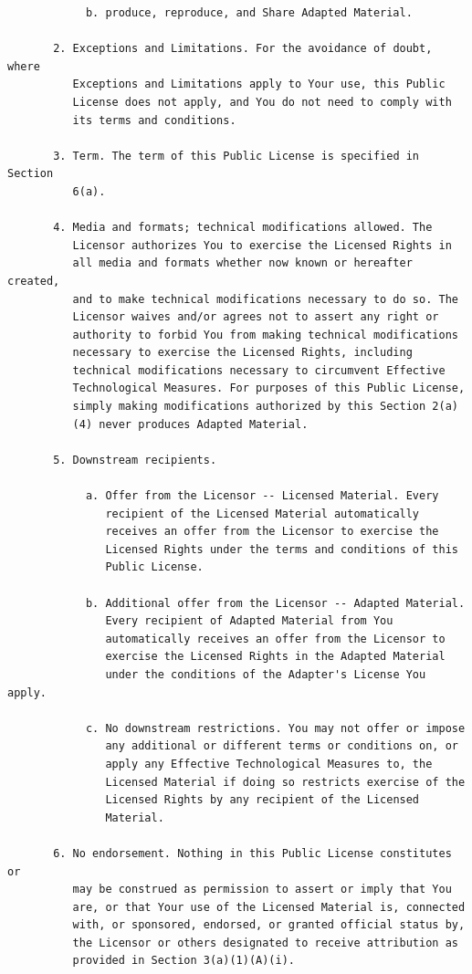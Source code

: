 \documentclass[12pt,spanish,]{scrartcl}
\begin{document}
\begin{verbatim}
            b. produce, reproduce, and Share Adapted Material.

       2. Exceptions and Limitations. For the avoidance of doubt, where
          Exceptions and Limitations apply to Your use, this Public
          License does not apply, and You do not need to comply with
          its terms and conditions.

       3. Term. The term of this Public License is specified in Section
          6(a).

       4. Media and formats; technical modifications allowed. The
          Licensor authorizes You to exercise the Licensed Rights in
          all media and formats whether now known or hereafter created,
          and to make technical modifications necessary to do so. The
          Licensor waives and/or agrees not to assert any right or
          authority to forbid You from making technical modifications
          necessary to exercise the Licensed Rights, including
          technical modifications necessary to circumvent Effective
          Technological Measures. For purposes of this Public License,
          simply making modifications authorized by this Section 2(a)
          (4) never produces Adapted Material.

       5. Downstream recipients.

            a. Offer from the Licensor -- Licensed Material. Every
               recipient of the Licensed Material automatically
               receives an offer from the Licensor to exercise the
               Licensed Rights under the terms and conditions of this
               Public License.

            b. Additional offer from the Licensor -- Adapted Material.
               Every recipient of Adapted Material from You
               automatically receives an offer from the Licensor to
               exercise the Licensed Rights in the Adapted Material
               under the conditions of the Adapter's License You apply.

            c. No downstream restrictions. You may not offer or impose
               any additional or different terms or conditions on, or
               apply any Effective Technological Measures to, the
               Licensed Material if doing so restricts exercise of the
               Licensed Rights by any recipient of the Licensed
               Material.

       6. No endorsement. Nothing in this Public License constitutes or
          may be construed as permission to assert or imply that You
          are, or that Your use of the Licensed Material is, connected
          with, or sponsored, endorsed, or granted official status by,
          the Licensor or others designated to receive attribution as
          provided in Section 3(a)(1)(A)(i).


\end{verbatim}
\end{document}
